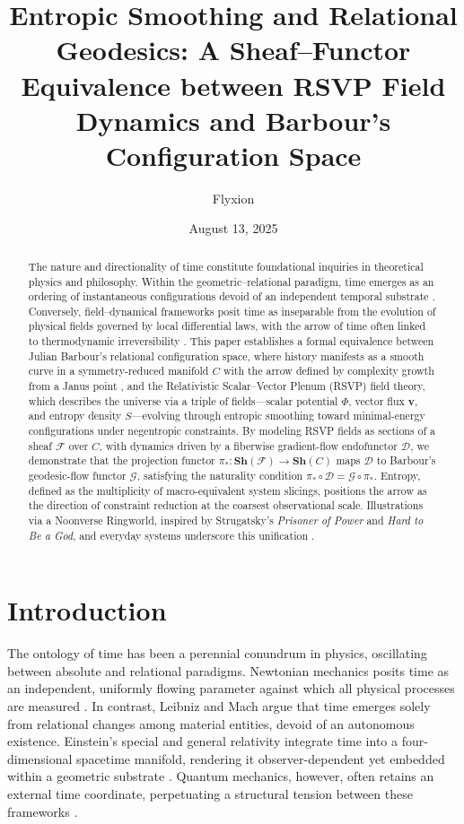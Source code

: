 \documentclass[11pt]{article}
\title{Entropic Smoothing and Relational Geodesics: A Sheaf--Functor Equivalence between RSVP Field Dynamics and Barbour's Configuration Space}
\author{Flyxion}
\date{August 13, 2025}
\theoremstyle{plain}
\theoremstyle{definition}
\begin{document}
\maketitle

\begin{abstract}
The nature and directionality of time constitute foundational inquiries in theoretical physics and philosophy. Within the geometric--relational paradigm, time emerges as an ordering of instantaneous configurations devoid of an independent temporal substrate \citep{Barbour1999}. Conversely, field--dynamical frameworks posit time as inseparable from the evolution of physical fields governed by local differential laws, with the arrow of time often linked to thermodynamic irreversibility \citep{Jaynes1957, Prigogine1997}. This paper establishes a formal equivalence between Julian Barbour’s relational configuration space, where history manifests as a smooth curve in a symmetry-reduced manifold $C$ with the arrow defined by complexity growth from a Janus point \citep{Barbour2014}, and the Relativistic Scalar--Vector Plenum (RSVP) field theory, which describes the universe via a triple of fields---scalar potential $\Phi$, vector flux $\mathbf{v}$, and entropy density $S$---evolving through entropic smoothing toward minimal-energy configurations under negentropic constraints. By modeling RSVP fields as sections of a sheaf $\mathscr{F}$ over $C$, with dynamics driven by a fiberwise gradient-flow endofunctor $\mathcal{D}$, we demonstrate that the projection functor $\pi_*: \mathbf{Sh}(\mathscr{F}) \to \mathbf{Sh}(C)$ maps $\mathcal{D}$ to Barbour’s geodesic-flow functor $\mathcal{G}$, satisfying the naturality condition $\pi_* \circ \mathcal{D} = \mathcal{G} \circ \pi_*$. Entropy, defined as the multiplicity of macro-equivalent system slicings, positions the arrow as the direction of constraint reduction at the coarsest observational scale. Illustrations via a Noonverse Ringworld, inspired by Strugatsky’s \textit{Prisoner of Power} and \textit{Hard to Be a God}, and everyday systems underscore this unification \citep{Barbour1999, MacLane1992}.
\end{abstract}

\tableofcontents

\section{Introduction}
The ontology of time has been a perennial conundrum in physics, oscillating between absolute and relational paradigms. Newtonian mechanics posits time as an independent, uniformly flowing parameter against which all physical processes are measured \citep{Barbour1999}. In contrast, Leibniz and Mach argue that time emerges solely from relational changes among material entities, devoid of an autonomous existence. Einstein’s special and general relativity integrate time into a four-dimensional spacetime manifold, rendering it observer-dependent yet embedded within a geometric substrate \citep{Rovelli2015}. Quantum mechanics, however, often retains an external time coordinate, perpetuating a structural tension between these frameworks \citep{Ellis2012}.
\end{document}
